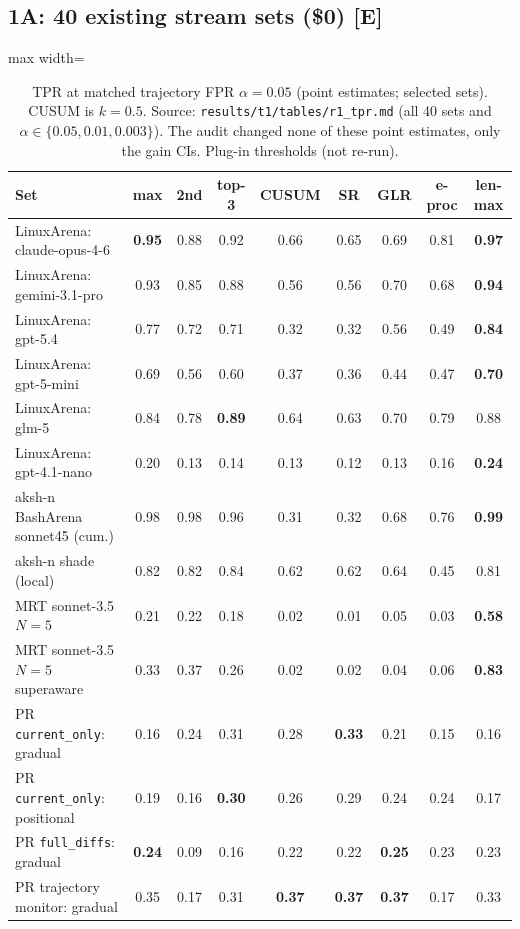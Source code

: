 \documentclass[11pt]{article}
\newcommand{\tE}{\textsf{\scriptsize\textcolor{ink2}{[E]}}\xspace}
\begin{document}
\subsection{1A: 40 existing stream sets (\$0) \tE}

\begin{table}[!htbp]\centering\small
\begin{adjustbox}{max width=\linewidth}\begin{tabular}{@{}lcccccccc@{}}
\toprule
Set & max & 2nd & top-3 & CUSUM & SR & GLR & e-proc & len-max\\
\midrule
LinuxArena: claude-opus-4-6 & \textbf{0.95} & 0.88 & 0.92 & 0.66 & 0.65 & 0.69 & 0.81 & \textbf{0.97}\\
LinuxArena: gemini-3.1-pro & 0.93 & 0.85 & 0.88 & 0.56 & 0.56 & 0.70 & 0.68 & \textbf{0.94}\\
LinuxArena: gpt-5.4 & 0.77 & 0.72 & 0.71 & 0.32 & 0.32 & 0.56 & 0.49 & \textbf{0.84}\\
LinuxArena: gpt-5-mini & 0.69 & 0.56 & 0.60 & 0.37 & 0.36 & 0.44 & 0.47 & \textbf{0.70}\\
LinuxArena: glm-5 & 0.84 & 0.78 & \textbf{0.89} & 0.64 & 0.63 & 0.70 & 0.79 & 0.88\\
LinuxArena: gpt-4.1-nano & 0.20 & 0.13 & 0.14 & 0.13 & 0.12 & 0.13 & 0.16 & \textbf{0.24}\\
aksh-n BashArena sonnet45 (cum.) & 0.98 & 0.98 & 0.96 & 0.31 & 0.32 & 0.68 & 0.76 & \textbf{0.99}\\
aksh-n shade (local) & 0.82 & 0.82 & 0.84 & 0.62 & 0.62 & 0.64 & 0.45 & 0.81\\
MRT sonnet-3.5 $N{=}5$ & 0.21 & 0.22 & 0.18 & 0.02 & 0.01 & 0.05 & 0.03 & \textbf{0.58}\\
MRT sonnet-3.5 $N{=}5$ superaware & 0.33 & 0.37 & 0.26 & 0.02 & 0.02 & 0.04 & 0.06 & \textbf{0.83}\\
PR \texttt{current\_only}: gradual & 0.16 & 0.24 & 0.31 & 0.28 & \textbf{0.33} & 0.21 & 0.15 & 0.16\\
PR \texttt{current\_only}: positional & 0.19 & 0.16 & \textbf{0.30} & 0.26 & 0.29 & 0.24 & 0.24 & 0.17\\
PR \texttt{full\_diffs}: gradual & \textbf{0.24} & 0.09 & 0.16 & 0.22 & 0.22 & \textbf{0.25} & 0.23 & 0.23\\
PR trajectory monitor: gradual & 0.35 & 0.17 & 0.31 & \textbf{0.37} & \textbf{0.37} & \textbf{0.37} & 0.17 & 0.33\\
\bottomrule
\end{tabular}\end{adjustbox}
\caption{TPR at matched trajectory FPR $\alpha=0.05$ (point estimates; selected sets). CUSUM is $k=0.5$. Source: \nolinkurl{results/t1/tables/r1_tpr.md} (all 40 sets and $\alpha\in\{0.05,0.01,0.003\}$). The audit changed none of these point estimates, only the gain CIs. Plug-in thresholds (not re-run).}
\end{table}
\end{document}
